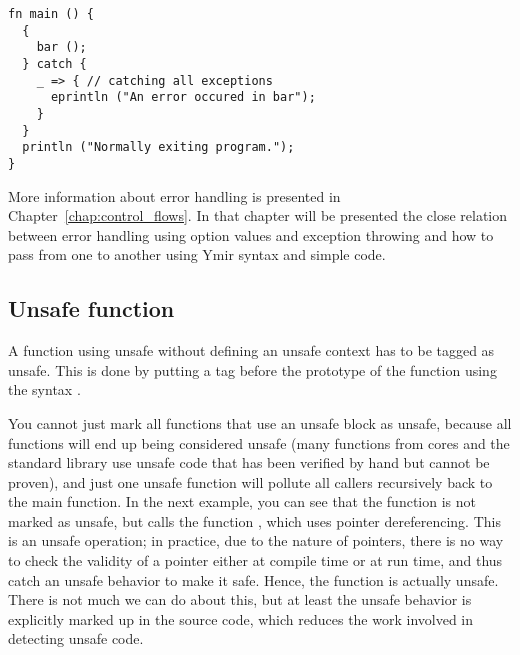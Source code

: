 
\begin{lstlisting}[style=coloredverbatim]
fn main () {
  {
    bar ();
  } catch {
    _ => { // catching all exceptions
      eprintln ("An error occured in bar");
    }
  }
  println ("Normally exiting program.");
}
\end{lstlisting}


More information about error handling is presented in
Chapter~\ref{chap:control_flows}. In that chapter will be presented the close
relation between error handling using option values and exception throwing and
how to pass from one to another using Ymir syntax and simple code.

\subsection {Unsafe function}

A function using unsafe without defining an unsafe context has to be tagged as
unsafe. This is done by putting a tag before the prototype of the function using
the syntax .



You cannot just mark all functions that use an unsafe block as unsafe, because
all functions will end up being considered unsafe (many functions from cores and
the standard library use unsafe code that has been verified by hand but cannot
be proven), and just one unsafe function will pollute all callers recursively
back to the main function. In the next example, you can see that the function
 is not marked as unsafe, but calls the function , which
uses pointer dereferencing. This is an unsafe operation; in practice, due to the
nature of pointers, there is no way to check the validity of a pointer either at
compile time or at run time, and thus catch an unsafe behavior to make it safe.
Hence, the  function is actually unsafe. There is not much we can do
about this, but at least the unsafe behavior is explicitly marked up in the
source code, which reduces the work involved in detecting unsafe code.

